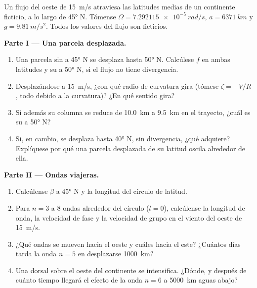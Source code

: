 \begin{problem}
\label{pb:b3:atmospheric-dynamics:1}
Un flujo del oeste de \qty{15}{m/s} atraviesa las latitudes medias de un
continente ficticio, a lo largo de \ang{45} N. Tómense $\Omega =
\qty{7.292115e-5}{rad/s}$, $a = \qty{6371}{km}$ y $g = \qty{9.81}{m/s^2}$.
Todos los valores del flujo son ficticios.

\medskip\noindent\textbf{Parte I --- Una parcela desplazada.}
\begin{enumerate}
\item Una parcela sin  a \ang{45} N se desplaza hasta
  \ang{50} N. Calcúlese $f$ en ambas latitudes y su  a
  \ang{50} N, si el flujo no tiene divergencia.
\item Desplazándose a \qty{15}{m/s}, ¿con qué radio de curvatura gira
  (tómese $\zeta = -V/R$, todo debido a la curvatura)? ¿En qué sentido gira?
\item Si además su columna se reduce de \qty{10.0}{km} a \qty{9.5}{km} en el
  trayecto, ¿cuál es su  a \ang{50} N?
\item Si, en cambio, se desplaza hasta \ang{40} N, sin divergencia, ¿qué  adquiere?
  Explíquese por qué una parcela desplazada de su
  latitud oscila alrededor de ella.
\end{enumerate}

\medskip\noindent\textbf{Parte II --- Ondas viajeras.}
\begin{enumerate}[resume]
\item Calcúlense $\beta$ a \ang{45} N y la longitud del círculo de latitud.
\item Para $n = 3$ a 8 ondas alrededor del círculo ($l = 0$), calcúlense la
  longitud de onda, la velocidad de fase y la velocidad de grupo en el viento del oeste de
  \qty{15}{m/s}.
\item ¿Qué ondas se mueven hacia el oeste y cuáles hacia el este? ¿Cuántos días tarda la onda
  $n = 5$ en desplazarse \qty{1000}{km}?
\item Una dorsal sobre el oeste del continente se intensifica. ¿Dónde, y después de
  cuánto tiempo llegará el efecto de la onda $n = 6$ a \qty{5000}{km}
  aguas abajo?
\end{enumerate}


\end{problem}
